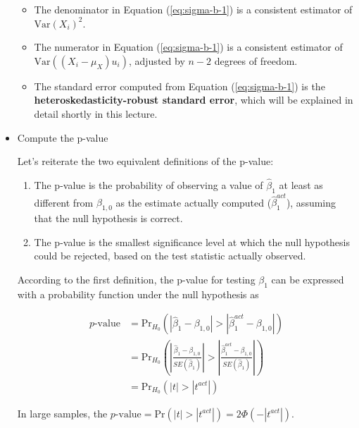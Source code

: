 \documentclass[a4paper,11pt]{article}
\newcommand{\var}{\mathrm{Var}}
\newcommand{\pr}{\mathrm{Pr}}
\begin{document}
\begin{itemize}
\begin{itemize}
\item The denominator in Equation (\ref{eq:sigma-b-1}) is a consistent
estimator of \(\var(X_i)^2\).

\item The numerator in Equation (\ref{eq:sigma-b-1}) is a consistent
estimator of \(\var((X_i - \mu_X)u_i)\), adjusted by \(n-2\) degrees
of freedom.

\item The standard error computed from Equation (\ref{eq:sigma-b-1}) is
the \textbf{heteroskedasticity-robust standard error}, which will be
explained in detail shortly in this lecture.
\end{itemize}

\item Compute the p-value
\label{sec:org039395e}

Let's reiterate the two equivalent definitions of the p-value:

\begin{enumerate}
\item The p-value is the probability of observing a value of
\(\hat{\beta}_1\) at least as different from \(\beta_{1,0}\) as the
estimate actually computed (\(\hat{\beta}^{act}_1\)), assuming that
the null hypothesis is correct.

\item The p-value is the smallest significance level at which the null
hypothesis could be rejected, based on the test statistic
actually observed.
\end{enumerate}

According to the first definition, the p-value for testing \(\beta_1\)
can be expressed with a probability function under the null
hypothesis as
\begin{LaTeX}
\begin{equation*}
\begin{split}
p\text{-value} &= \pr_{H_0} \left( | \hat{\beta}_1 - \beta_{1,0} | > | \hat{\beta}^{act}_1 - \beta_{1,0} | \right) \\
&= \pr_{H_0} \left( \left| \frac{\hat{\beta}_1 - \beta_{1,0}}{SE(\hat{\beta}_1)} \right| > \left| \frac{\hat{\beta}^{act}_1 - \beta_{1,0}}{SE(\hat{\beta}_1)} \right| \right) \\
&= \pr_{H_0} \left( |t| > |t^{act}| \right)
\end{split}
\end{equation*}
\end{LaTeX}

In large samples, the \(p\text{-value} = \pr\left(|t| > |t^{act}|
\right) = 2 \varPhi(-|t^{act}|)\).


\end{itemize}
\end{document}
